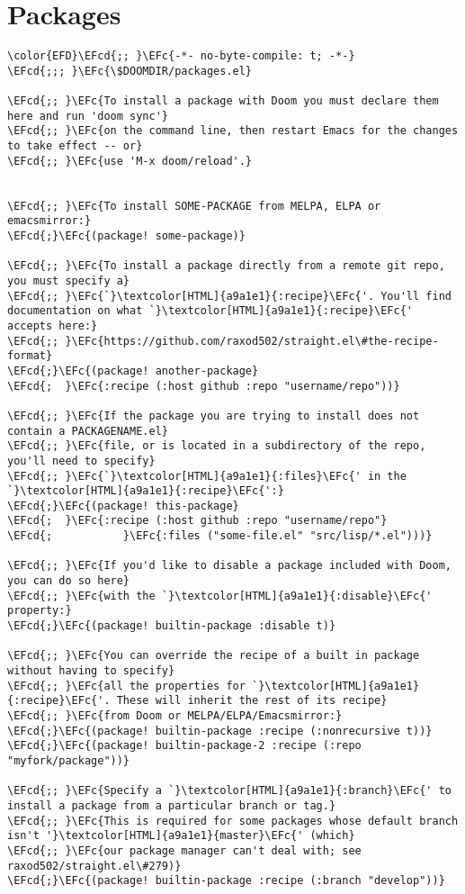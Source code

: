 \documentclass[a4wide,10pt]{article}
\newcommand{\EFc}[1]{\textcolor{EFc}{#1}} %
\newcommand{\EFcd}[1]{\textcolor{EFcd}{#1}} %
\begin{document}
\section{Packages}
\label{sec:org7946494}
\begin{Code}
\begin{Verbatim}
\color{EFD}\EFcd{;; }\EFc{-*- no-byte-compile: t; -*-}
\EFcd{;;; }\EFc{\$DOOMDIR/packages.el}

\EFcd{;; }\EFc{To install a package with Doom you must declare them here and run 'doom sync'}
\EFcd{;; }\EFc{on the command line, then restart Emacs for the changes to take effect -- or}
\EFcd{;; }\EFc{use 'M-x doom/reload'.}


\EFcd{;; }\EFc{To install SOME-PACKAGE from MELPA, ELPA or emacsmirror:}
\EFcd{;}\EFc{(package! some-package)}

\EFcd{;; }\EFc{To install a package directly from a remote git repo, you must specify a}
\EFcd{;; }\EFc{`}\textcolor[HTML]{a9a1e1}{:recipe}\EFc{'. You'll find documentation on what `}\textcolor[HTML]{a9a1e1}{:recipe}\EFc{' accepts here:}
\EFcd{;; }\EFc{https://github.com/raxod502/straight.el\#the-recipe-format}
\EFcd{;}\EFc{(package! another-package}
\EFcd{;  }\EFc{:recipe (:host github :repo "username/repo"))}

\EFcd{;; }\EFc{If the package you are trying to install does not contain a PACKAGENAME.el}
\EFcd{;; }\EFc{file, or is located in a subdirectory of the repo, you'll need to specify}
\EFcd{;; }\EFc{`}\textcolor[HTML]{a9a1e1}{:files}\EFc{' in the `}\textcolor[HTML]{a9a1e1}{:recipe}\EFc{':}
\EFcd{;}\EFc{(package! this-package}
\EFcd{;  }\EFc{:recipe (:host github :repo "username/repo"}
\EFcd{;           }\EFc{:files ("some-file.el" "src/lisp/*.el")))}

\EFcd{;; }\EFc{If you'd like to disable a package included with Doom, you can do so here}
\EFcd{;; }\EFc{with the `}\textcolor[HTML]{a9a1e1}{:disable}\EFc{' property:}
\EFcd{;}\EFc{(package! builtin-package :disable t)}

\EFcd{;; }\EFc{You can override the recipe of a built in package without having to specify}
\EFcd{;; }\EFc{all the properties for `}\textcolor[HTML]{a9a1e1}{:recipe}\EFc{'. These will inherit the rest of its recipe}
\EFcd{;; }\EFc{from Doom or MELPA/ELPA/Emacsmirror:}
\EFcd{;}\EFc{(package! builtin-package :recipe (:nonrecursive t))}
\EFcd{;}\EFc{(package! builtin-package-2 :recipe (:repo "myfork/package"))}

\EFcd{;; }\EFc{Specify a `}\textcolor[HTML]{a9a1e1}{:branch}\EFc{' to install a package from a particular branch or tag.}
\EFcd{;; }\EFc{This is required for some packages whose default branch isn't '}\textcolor[HTML]{a9a1e1}{master}\EFc{' (which}
\EFcd{;; }\EFc{our package manager can't deal with; see raxod502/straight.el\#279)}
\EFcd{;}\EFc{(package! builtin-package :recipe (:branch "develop"))}


\end{Verbatim}
\end{Code}
\end{document}
